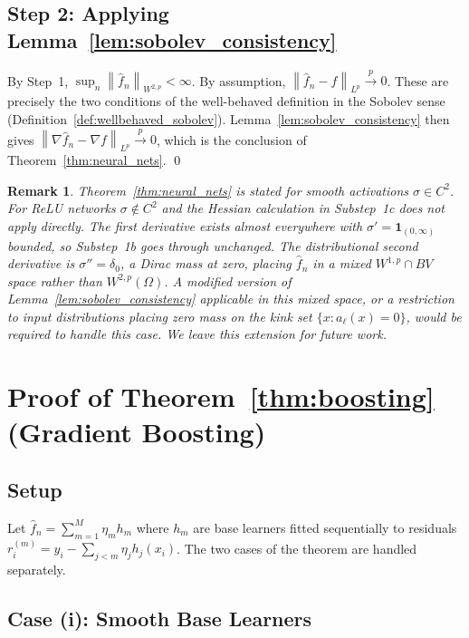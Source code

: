 \documentclass[12pt]{article}
\newtheorem{remark}{Remark}
\newcommand{\norm}[1]{\left\| #1 \right\|}
\newcommand{\Wtwop}{W^{2,p}(\Omega)}
\newcommand{\fn}{\hat{f}_n}
\newcommand{\xrightarrowp}{\xrightarrow{p}}
\begin{document}
	\subsection{Step 2: Applying Lemma~\ref{lem:sobolev_consistency}}
	
	By Step~1, $\sup_n \norm{\fn}_{W^{2,p}} < \infty$. By assumption,
	$\norm{\fn - f}_{L^p} \xrightarrowp 0$. These are precisely the two conditions
	of the well-behaved definition in the Sobolev sense
	(Definition~\ref{def:wellbehaved_sobolev}). Lemma~\ref{lem:sobolev_consistency}
	then gives $\norm{\nabla \fn - \nabla f}_{L^p} \xrightarrowp 0$, which is the
	conclusion of Theorem~\ref{thm:neural_nets}. \qed
	
	\begin{remark}
		Theorem~\ref{thm:neural_nets} is stated for smooth activations $\sigma \in
		C^2$. For ReLU networks $\sigma \notin C^2$ and the Hessian calculation in
		Substep~1c does not apply directly. The first derivative exists almost
		everywhere with $\sigma' = \mathbf{1}_{(0,\infty)}$ bounded, so Substep~1b
		goes through unchanged. The distributional second derivative is $\sigma'' =
		\delta_0$, a Dirac mass at zero, placing $\fn$ in a mixed $W^{1,p} \cap BV$
		space rather than $\Wtwop$. A modified version of
		Lemma~\ref{lem:sobolev_consistency} applicable in this mixed space, or a
		restriction to input distributions placing zero mass on the kink set
		$\{x : a_\ell(x) = 0\}$, would be required to handle this case. We leave this
		extension for future work.
	\end{remark}
	
	\section{Proof of Theorem~\ref{thm:boosting} (Gradient Boosting)}
	\label{app:boosting}
	
	\subsection{Setup}
	
	Let $\fn = \sum_{m=1}^M \eta_m h_m$ where $h_m$ are base learners fitted
	sequentially to residuals $r_i^{(m)} = y_i - \sum_{j < m} \eta_j h_j(x_i)$.
	The two cases of the theorem are handled separately.
	
	\subsection{Case (i): Smooth Base Learners}
	
\end{document}
